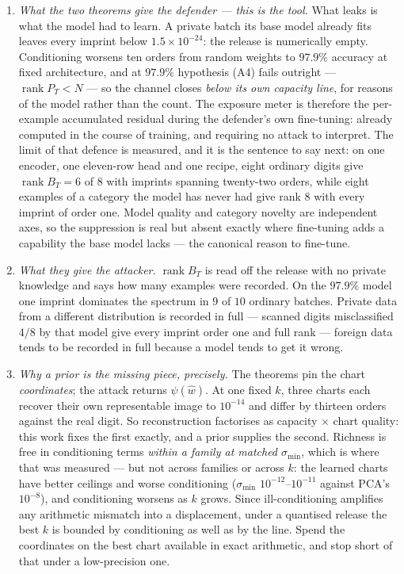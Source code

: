 \begin{enumerate}
\item \emph{What the two theorems give the defender — this is the tool.}
  What leaks is what the model had to learn. A private batch its base model
  already fits leaves every imprint below $1.5\times10^{-24}$: the release is
  numerically empty. Conditioning worsens ten orders from random weights to
  $97.9\%$ accuracy at fixed architecture, and at $97.9\%$ hypothesis (A4)
  fails outright — $\operatorname{rank}P_T<N$ — so the channel closes
  \emph{below its own capacity line}, for reasons of the model rather than
  the count. The exposure meter is therefore the per-example accumulated
  residual during the defender's own fine-tuning: already computed in the
  course of training, and requiring no attack to interpret. The limit of that
  defence is measured, and it is the sentence to say next: on one encoder, one
  eleven-row head and one recipe, eight ordinary digits give
  $\operatorname{rank}B_T=6$ of $8$ with imprints spanning twenty-two orders,
  while eight examples of a category the model has never had give rank $8$
  with every imprint of order one. Model quality and category novelty are
  independent axes, so the suppression is real but absent exactly where
  fine-tuning adds a capability the base model lacks --- the canonical reason
  to fine-tune.

\item \emph{What they give the attacker.} $\operatorname{rank}B_T$ is read
  off the release with no private knowledge and says how many examples were
  recorded. On the $97.9\%$ model one imprint dominates the spectrum in $9$ of
  $10$
  ordinary batches. Private data from a different distribution is recorded
  in full — scanned digits misclassified $4/8$ by that model give every
  imprint order one and full rank — foreign data tends to be
  recorded in full because a model tends to get it wrong.

\item \emph{Why a prior is the missing piece, precisely.} The theorems pin
  the chart \emph{coordinates}; the attack returns $\psi(\hat w)$. At one
  fixed $k$, three charts each recover their own representable image to
  $10^{-14}$ and differ by thirteen orders against the real digit. So
  reconstruction factorises as capacity $\times$ chart quality: this work
  fixes the first exactly, and a prior supplies the second. Richness is free in
  conditioning terms \emph{within a family at matched $\sigma_{\min}$}, which
  is where that was measured --- but not across families or across $k$: the
  learned charts have better ceilings and worse conditioning ($\sigma_{\min}$
  $10^{-12}$--$10^{-11}$ against PCA's $10^{-8}$), and conditioning worsens as
  $k$ grows. Since ill-conditioning amplifies any arithmetic mismatch into a
  displacement, under a quantised release the best $k$ is bounded by
  conditioning as well as by the line. Spend the coordinates on the best chart
  available in exact arithmetic, and stop short of that under a low-precision
  one.


\end{enumerate}

